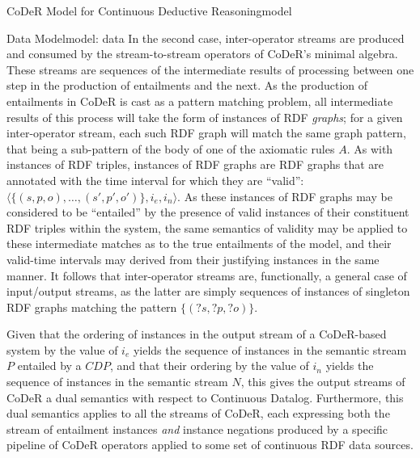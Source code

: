 \begin{nestedsection}{CoDeR Model for Continuous Deductive Reasoning}{model}
\begin{nestedsection}{Data Model}{model: data}
		In the second case, inter-operator streams are produced and consumed by the stream-to-stream operators of CoDeR's minimal algebra.
		These streams are sequences of the intermediate results of processing between one step in the production of entailments and the next.
		As the production of entailments in CoDeR is cast as a pattern matching problem, all intermediate results of this process will take the form of instances of RDF \emph{graphs};
		for a given inter-operator stream, each such RDF graph will match the same graph pattern, that being a sub-pattern of the body of one of the axiomatic rules $A$.
		As with instances of RDF triples, instances of RDF graphs are RDF graphs that are annotated with the time interval for which they are ``valid'': ${\langle \{(s,p,o),\dots,(s',p',o')\},i_{e},i_{n} \rangle}$.
		As these instances of RDF graphs may be considered to be ``entailed'' by the presence of valid instances of their constituent RDF triples within the system, the same semantics of validity may be applied to these intermediate matches as to the true entailments of the model, and their valid-time intervals may derived from their justifying instances in the same manner.
		It follows that inter-operator streams are, functionally, a general case of input/output streams, as the latter are simply sequences of instances of singleton RDF graphs matching the pattern ${\{(?s,?p,?o)\}}$.

		Given that the ordering of instances in the output stream of a CoDeR-based system by the value of $i_{e}$ yields the sequence of instances in the semantic stream $P$ entailed by a ${CDP}$, and that their ordering by the value of $i_{n}$ yields the sequence of instances in the semantic stream $N$, this gives the output streams of CoDeR a dual semantics with respect to Continuous Datalog.
		Furthermore, this dual semantics applies to all the streams of CoDeR, each expressing both the stream of entailment instances \emph{and} instance negations produced by a specific pipeline of CoDeR operators applied to some set of continuous RDF data sources.
	\end{nestedsection}



\end{nestedsection}